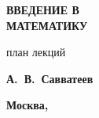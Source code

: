 
{\thispagestyle{empty}


\begin{flushright}
\quad

\vspace{2cm}

{\fontsize{100pt}{0pt}\bfseries\sffamily ВВЕДЕНИЕ В\\[30pt] МАТЕМАТИКУ}

\vspace{2cm}

{\fontsize{20pt}{22pt}\sffamily план лекций\\
}

\vspace{2cm}

{\Large\bfseries\sffamily 	А.~В.~Савватеев}

\vfill

{\Large\bfseries\sffamily 	Москва, \number\year}
\end{flushright}
}


\markboth{}{}

\clearpage
\renewcommand*\contentsname{\vspace{-20mm}\quad\hfill\Large\bfseries\sffamily\MakeUppercase{Содержание}\vspace{2mm}\textcolor{darkred}{\hrule}\thispagestyle{empty}}
\tableofcontents
 
